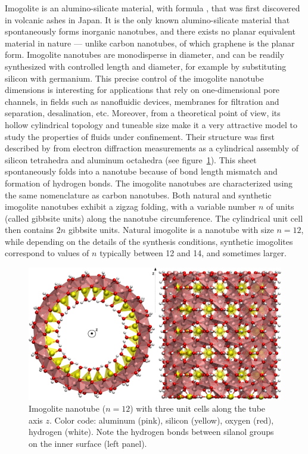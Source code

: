 \documentclass[thesis]{subfiles}
\begin{document}
Imogolite is an alumino-silicate material, with formula , that
was first discovered in volcanic ashes in Japan\cite{Yoshinaga1962}. It is the
only known alumino-silicate material that spontaneously forms inorganic
nanotubes, and there exists no planar equivalent material in nature --- unlike
carbon nanotubes, of which graphene is the planar form. Imogolite nanotubes are
monodisperse in diameter, and can be readily synthesized with controlled length
and diameter, for example by substituting silicon with
germanium\cite{Amara2013}. This precise control of the imogolite nanotube
dimensions is interesting for applications that rely on one-dimensional pore
channels, in fields such as nanofluidic devices, membranes for filtration and
separation, desalination, etc. Moreover, from a theoretical point of view, its
hollow cylindrical topology and tuneable size make it a very attractive model to
study the properties of fluids under confinement. Their structure was first
described by \citeauthor{Cradwick1972}\cite{Cradwick1972} from electron
diffraction measurements as a cylindrical assembly of silicon tetrahedra and
aluminum octahedra (see figure~\ref{fig:imogolite:structure}). This sheet
spontaneously folds into a nanotube because of bond length mismatch and
formation of hydrogen bonds\cite{Lee2011,Gonzalez2014}. The imogolite nanotubes
are characterized using the same nomenclature as carbon nanotubes. Both natural
and synthetic imogolite nanotubes exhibit a zigzag folding, with a variable
number $n$ of  units (called gibbsite units) along the
nanotube circumference. The cylindrical unit cell then contains $2n$ gibbsite
units.  Natural imogolite is a nanotube with size $n=12$, while depending on the
details of the synthesis conditions, synthetic imogolites correspond to values
of $n$ typically between 12 and 14, and sometimes larger.

\begin{figure}[b]
    \centering
    \includegraphics[width=\textwidth]{figures/images/imogolite}
    \caption{Imogolite nanotube ($n=12$) with three unit cells along the tube
    axis $z$. Color code: aluminum (pink), silicon (yellow), oxygen (red),
    hydrogen (white). Note the hydrogen bonds between silanol groups on the
    inner surface (left panel).}
    \label{fig:imogolite:structure}
\end{figure}
\end{document}
